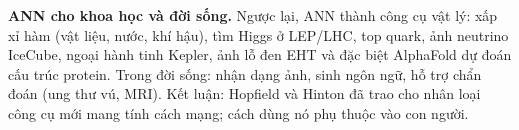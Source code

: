 \documentclass[a4paper,12pt]{article}
\begin{document}
\textbf{ANN cho khoa học và đời sống.} Ngược lại, ANN thành công cụ vật lý: xấp xỉ hàm (vật liệu, nước, khí hậu), tìm Higgs ở LEP/LHC, top quark, ảnh neutrino IceCube, ngoại hành tinh Kepler, ảnh lỗ đen EHT và đặc biệt AlphaFold dự đoán cấu trúc protein. Trong đời sống: nhận dạng ảnh, sinh ngôn ngữ, hỗ trợ chẩn đoán (ung thư vú, MRI). Kết luận: Hopfield và Hinton đã trao cho nhân loại công cụ mới mang tính cách mạng; cách dùng nó phụ thuộc vào con người.
\end{document}
